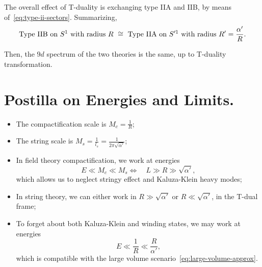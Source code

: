 The overall effect of T-duality is exchanging type IIA and IIB, by means of~\eqref{eq:type-ii-sectors}. Summarizing,
\begin{equation*}
    \textup{Type IIB on $S^1$ with radius $R$ $\; \cong\;$ Type IIA on $S'^1$ with radius $R' = \frac{\alpha'}{R}$} .
\end{equation*}

 Then, the $9d$ spectrum of the two theories is the same, up to T-duality transformation.

\section{Postilla on Energies and Limits.}
\begin{itemize}
    \item The compactification scale is $M_c = \frac{1}{R}$;
    \item The string scale is $M_s = \frac{1}{l_s} = \frac{1}{2\pi\sqrt{\alpha'}}$;
    \item In field theory compactification, we work at energies
    \begin{equation}
        E \ll M_c \ll M_s \iff \quad L \gg R \gg \sqrt{\alpha'},
    \end{equation}
    which allows us to neglect stringy effect and Kaluza-Klein heavy modes;
    \item In string theory, we can either work in $R \gg \sqrt{\alpha'}$ or $R \ll \sqrt{\alpha'}$, in the T-dual frame;
    \item To forget about both Kaluza-Klein and winding states, we may work at energies
    \begin{equation}
        E \ll \frac{1}{R} \ll \frac{R}{\alpha'},
    \end{equation}
    which is compatible with the large volume scenario~\eqref{eq:large-volume-approx}.
\end{itemize}